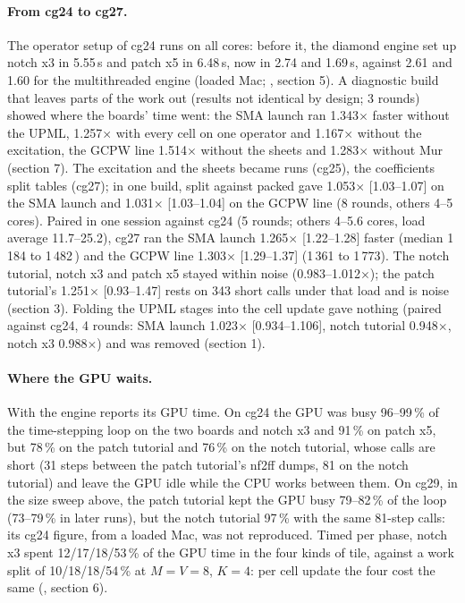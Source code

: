 \paragraph{From cg24 to cg27.} The operator setup of cg24 runs on all cores: before it, the diamond engine set up
notch x3 in 5.55\,s and patch x5 in 6.48\,s, now in 2.74 and 1.69\,s, against 2.61 and 1.60 for the multithreaded
engine (loaded Mac; , section 5). A diagnostic build that
leaves parts of the work out (results not identical by design; 3 rounds) showed where the boards' time went: the SMA
launch ran 1.343$\times$ faster without the UPML, 1.257$\times$ with every cell on one operator and 1.167$\times$ without
the excitation, the GCPW line 1.514$\times$ without the sheets and 1.283$\times$ without Mur (section 7). The excitation
and the sheets became runs (cg25), the coefficients split tables (cg27); in one build, split against packed gave
1.053$\times$ [1.03--1.07] on the SMA launch and 1.031$\times$ [1.03--1.04] on the GCPW line (8 rounds, others 4--5
cores). Paired in one session against cg24 (5 rounds; others 4--5.6 cores, load average 11.7--25.2), cg27 ran the SMA
launch 1.265$\times$ [1.22--1.28] faster (median 1\,184 to 1\,482\,\MC) and the GCPW line 1.303$\times$ [1.29--1.37]
(1\,361 to 1\,773). The notch tutorial, notch x3 and patch x5 stayed within noise (0.983--1.012$\times$); the patch
tutorial's 1.251$\times$ [0.93--1.47] rests on 343 short calls under that load and is noise (section 3). Folding the
UPML stages into the cell update gave nothing (paired against cg24, 4 rounds: SMA launch 1.023$\times$
[0.934--1.106], notch tutorial 0.948$\times$, notch x3 0.988$\times$) and was removed (section 1).

\paragraph{Where the GPU waits.} With  the engine reports its GPU time. On cg24 the GPU
was busy 96--99\,\% of the time-stepping loop on the two boards and notch x3 and 91\,\% on patch x5, but 78\,\% on the
patch tutorial and 76\,\% on the notch tutorial, whose  calls are short (31 steps between the patch
tutorial's nf2ff dumps, 81 on the notch tutorial) and leave the GPU idle while the CPU works between them. On cg29, in
the size sweep above, the patch tutorial kept the GPU busy 79--82\,\% of the loop (73--79\,\% in later runs), but the
notch tutorial 97\,\% with the same 81-step calls: its cg24 figure, from a loaded Mac, was not reproduced. Timed per
phase, notch x3 spent 12/17/18/53\,\% of the GPU time in the four kinds of tile, against a work split of
10/18/18/54\,\% at $M=V=8$, $K=4$: per cell update the four cost the same
(, section 6).

